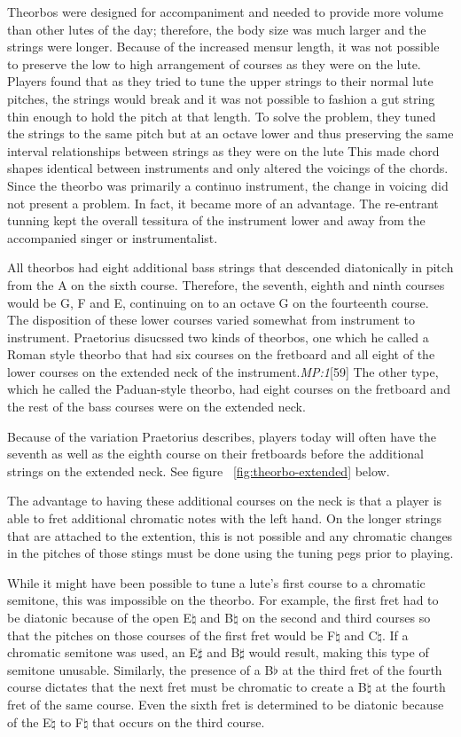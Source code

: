 Theorbos were designed for accompaniment and needed to provide more volume than other
lutes of the day; therefore, the body size was much larger and the strings were longer.
Because of the increased mensur length, it was not possible to preserve the low to high
arrangement of courses as they were on the lute. Players found that as they tried to tune
the upper strings to their normal lute pitches, the strings would break and it was not
possible to fashion a gut string thin enough to hold the pitch at that length.  To solve
the problem, they tuned the strings to the same pitch but at an octave lower and thus
preserving the same interval relationships between strings as they were on the lute  This
made chord shapes identical between instruments and only altered the voicings of the
chords. Since the theorbo was primarily a continuo instrument, the change in voicing did
not present a problem. In fact, it became more of an advantage.  The re-entrant tunning
kept the overall tessitura of the instrument lower and away from the accompanied singer or
instrumentalist.

All theorbos had eight additional bass strings that descended diatonically in pitch from
the A on the sixth course.  Therefore, the seventh, eighth and ninth courses would be G, F
and E, continuing on to an octave G on the fourteenth course.  The disposition of these
lower courses varied somewhat from instrument to instrument.  Praetorius disucssed two
kinds of theorbos, one which he called a Roman style theorbo that had six courses on the
fretboard and all eight of the lower courses on the extended neck of the
instrument.\textit{MP:1}[59] The other type, which he called the Paduan-style
theorbo, had eight courses on the fretboard and the rest of the bass courses were on the
extended neck.

Because of the variation Praetorius describes, players today will often have the seventh
as well as the eighth course on their fretboards before the additional strings on the
extended neck. See figure ~\ref{fig:theorbo-extended} below.

The advantage to having these additional courses on the neck is that a
player is able to fret additional chromatic notes with the left hand.  On the longer
strings that are attached to the extention, this is not possible and any chromatic changes
in the pitches of those stings must be done using the tuning pegs prior to playing.

While it might have been possible to tune a lute's first course to a chromatic semitone,
this was impossible on the theorbo. For example, the first fret had to be diatonic because
of the open E$\natural$ and B$\natural$ on the second and third courses so that the
pitches on those courses of the first fret would be F$\natural$ and C$\natural$.  If a
chromatic semitone was used, an E$\sharp$ and B$\sharp$ would result, making this type of
semitone unusable. Similarly, the presence of a B$\flat$ at the third fret of the fourth
course dictates that the next fret must be chromatic to create a B$\natural$ at the fourth
fret of the same course. Even the sixth fret is determined to be diatonic because of the
E$\natural$ to F$\natural$ that occurs on the third course.


